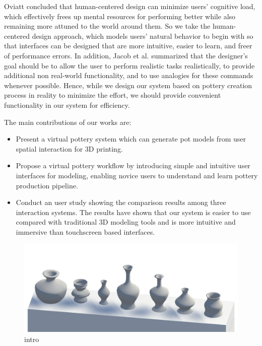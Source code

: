 Oviatt \cite{oviatt2006human} concluded that human-centered design can minimize users’ cognitive load, which effectively frees up mental resources for performing better while also remaining more attuned to the world around them.
So we take the human-centered design approach, which models users’ natural behavior to begin with so that interfaces can be designed that are more intuitive, easier to learn, and freer of performance errors.
In addition, Jacob et al. \cite{Jacob2008Reality} summarized that the designer's goal should be to allow the user to perform realistic tasks realistically, to provide additional non real-world functionality, and to use analogies for these commands whenever possible.
Hence, while we design our system based on pottery creation process in reality to minimize the effort, we should provide convenient functionality in our system for efficiency.

The main contributions of our works are:

\begin{itemize}
\item Present a virtual pottery system which can generate pot models from user spatial interaction for 3D printing.
\item Propose a virtual pottery workflow by introducing simple and intuitive user interfaces for modeling, enabling novice users to understand and learn pottery production pipeline.
\item Conduct an user study showing the comparison results among three interaction systems. The results have shown that our system is easier to use compared with traditional 3D modeling tools and is more intuitive and immersive than touchscreen based interfaces.
\end{itemize}

\begin{figure}
  \includegraphics[width=\textwidth]{0.PNG}
\caption{intro}
\label{fig:1}       %
\end{figure}

